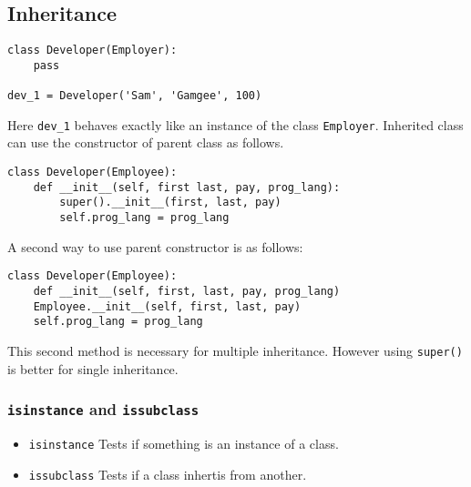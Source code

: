 \subsection*{Inheritance}

\begin{mdframed}[backgroundcolor=gray!10,linecolor=Firebrick4]
\begin{verbatim}
class Developer(Employer):
    pass

dev_1 = Developer('Sam', 'Gamgee', 100)
\end{verbatim}
\end{mdframed}

Here \texttt{dev\_1} behaves exactly like an instance of the class \texttt{Employer}.
Inherited class can use the constructor of parent class as follows.

\begin{mdframed}[backgroundcolor=gray!10,linecolor=Firebrick4]
\begin{verbatim}
class Developer(Employee):
    def __init__(self, first last, pay, prog_lang):
        super().__init__(first, last, pay)
        self.prog_lang = prog_lang
\end{verbatim}
\end{mdframed}

\vfill\null
\columnbreak

A second way to use parent constructor is as follows:

\begin{mdframed}[backgroundcolor=gray!10,linecolor=Firebrick4]
\begin{verbatim}
class Developer(Employee):
    def __init__(self, first, last, pay, prog_lang)
    Employee.__init__(self, first, last, pay)
    self.prog_lang = prog_lang
\end{verbatim}
\end{mdframed}

This second method is necessary for multiple inheritance. However using \texttt{super()} is better for single inheritance.

\subsubsection*{\texttt{isinstance} and \texttt{issubclass}}

\begin{itemize}
\item \texttt{isinstance} Tests if something is an instance of a class. 
\item \texttt{issubclass} Tests if a class inhertis from another.
\end{itemize}

